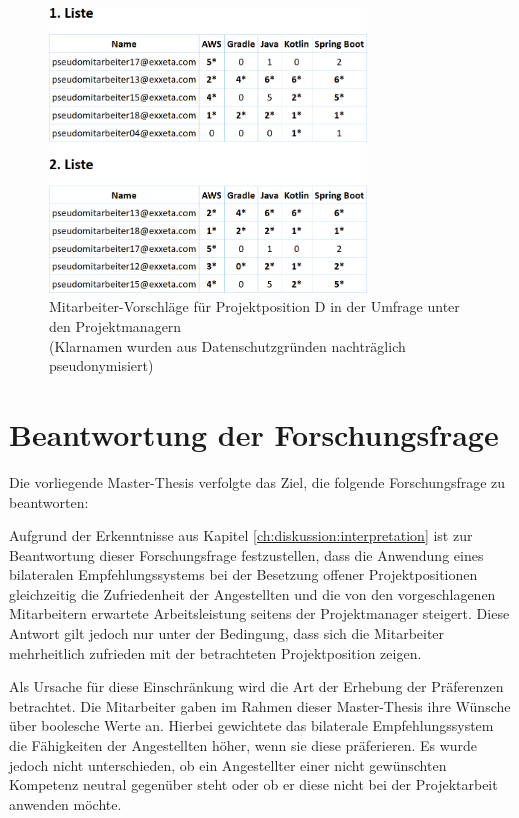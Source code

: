 \begin{figure}[h]
	\centering
	\includegraphics[width=0.75\textwidth]{gfx/projektposition-d.png}
	\caption{Mitarbeiter-Vorschläge für Projektposition D in der Umfrage unter den Projektmanagern\\
	(Klarnamen wurden aus Datenschutzgründen nachträglich pseudonymisiert)}
	\label{fig:diskussion:interpretation:abb2}
\end{figure}

\section{Beantwortung der Forschungsfrage}
\label{ch:diskussion:beantwortungForschungsfrage}
Die vorliegende Master-Thesis verfolgte das Ziel, die folgende Forschungsfrage zu beantworten: \forschungsfrage

Aufgrund der Erkenntnisse aus Kapitel \ref{ch:diskussion:interpretation} ist zur Beantwortung dieser Forschungsfrage festzustellen, dass die Anwendung eines bilateralen Empfehlungssystems bei der Besetzung offener Projektpositionen gleichzeitig die Zufriedenheit der Angestellten und die von den vorgeschlagenen Mitarbeitern erwartete Arbeitsleistung seitens der Projektmanager steigert. Diese Antwort gilt jedoch nur unter der Bedingung, dass sich die Mitarbeiter mehrheitlich zufrieden mit der betrachteten Projektposition zeigen.

Als Ursache für diese Einschränkung wird die Art der Erhebung der Präferenzen betrachtet. Die Mitarbeiter gaben im Rahmen dieser Master-Thesis ihre Wünsche über boolesche Werte an. Hierbei gewichtete das bilaterale Empfehlungssystem die Fähigkeiten der Angestellten höher, wenn sie diese präferieren. Es wurde jedoch nicht unterschieden, ob ein Angestellter einer nicht gewünschten Kompetenz neutral gegenüber steht oder ob er diese nicht bei der Projektarbeit anwenden möchte.

